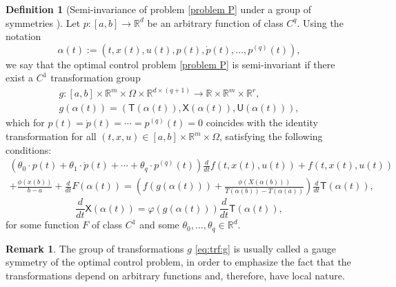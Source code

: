 \documentclass{my-aims}
\theoremstyle{definition}
\newtheorem{definition}[theorem]{Definition}
\newtheorem{remark}{Remark}
\begin{document}
\begin{definition}[Semi-invariance of problem \eqref{problem P} 
under a group of symmetries \cite{Torres2003MR1980565}]
\label{DEF inv symm}
Let $p:[a,b]\rightarrow \mathbb{R}^d$ be an arbitrary 
function of class $C^q$. Using the notation
$$
\alpha(t):=\left(t,x(t),u(t),p(t),\dot{p}(t),\dots,p^{(q)}(t)\right),
$$
we say that the optimal control problem \eqref{problem P} 
is semi-invariant if there exist a $C^1$ transformation group
\begin{equation}
\label{eq:trf:g}
\begin{gathered}
g:[a,b]\times\mathbb{R}^m\times \Omega\times\mathbb{R}^{d\times(q+1)}
\rightarrow\mathbb{R}\times\mathbb{R}^m\times \mathbb{R}^r,\\
g(\alpha(t))=\left(\mathsf{T}(\alpha(t)),\mathsf{X}(\alpha(t)),\mathsf{U}(\alpha(t))\right),
\end{gathered}
\end{equation}
which for $p(t)=\dot{p}(t)=\cdots=p^{(q)}(t)=0$ coincides with the identity transformation 
for all $(t,x,u)\in[a,b]\times \mathbb{R}^m\times \Omega$, satisfying the following conditions:
\begin{multline*}
\left(\theta_0\cdot p(t)+\theta_1\cdot \dot{p}(t)
+\cdots+\theta_q\cdot p^{(q)}(t)\right)
\frac{d}{dt}f(t,x(t),u(t))+f(t,x(t),u(t))\\
+\frac{\phi(x(b))}{b-a} + \frac{d}{dt}F(\alpha(t))
=\left(f(g(\alpha(t)))+\frac{\phi(X\left(\alpha(b)\right))}{T(\alpha(b))-T(\alpha(a))}\right)
\frac{d}{dt}\mathsf{T}(\alpha(t)),
\end{multline*}
\begin{equation*}
\frac{d}{dt}\mathsf{X}(\alpha(t))=\varphi\left(g(\alpha(t))\right)\frac{d}{dt}\mathsf{T}(\alpha(t)),
\end{equation*}
for some function $F$ of class $C^1$ and some $\theta_0,\dots, \theta_q \in \mathbb{R}^d$.
\end{definition}

\begin{remark}
The group of transformations $g$ \eqref{eq:trf:g} is usually called 
a gauge symmetry of the optimal control problem, in order to emphasize 
the fact that the transformations depend on arbitrary functions and, 
therefore, have local nature.
\end{remark}
\end{document}
